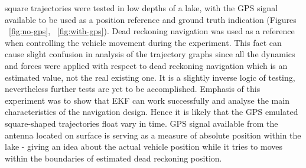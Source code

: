  square trajectories were tested in low depths of a lake, with the GPS signal available to be used as a position reference and ground truth indication (Figures ~\ref{fig:no-gps}, ~\ref{fig:with-gps}). Dead reckoning navigation was used as a reference when controlling the vehicle movement during the experiment. This fact can cause slight confusion in analysis of the trajectory graphs since all the dynamics and forces were applied with respect to dead reckoning navigation which is an estimated value, not the real existing one. It is a slightly inverse logic of testing, nevertheless further tests are yet to be accomplished. Emphasis of this experiment was to show that EKF can work successfully and analyse the main characteristics of the navigation design. Hence it is likely that the GPS emulated square-shaped trajectories float vary in time. GPS signal available from the antenna located on surface is serving as a measure of absolute position within the lake - giving an idea about the actual vehicle position while it tries to moves within the boundaries of estimated dead reckoning position. 

